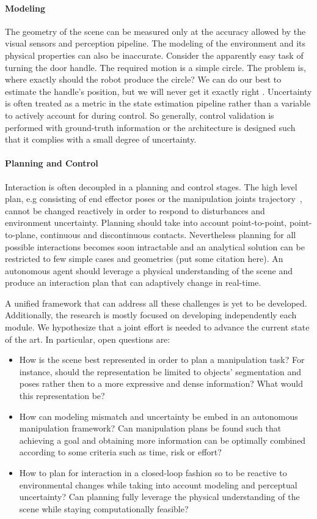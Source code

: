 \paragraph{Modeling} The geometry of the scene can be measured only at the accuracy allowed by the visual sensors and perception pipeline. The modeling of the environment and its physical properties can also be inaccurate. Consider the apparently easy task of turning the door handle. The required motion is a simple circle. The problem is, where exactly should the robot produce the circle? We can do our best to estimate the handle’s position, but we will never get it exactly right \citep{mason2018toward}. Uncertainty is often treated as a metric in the state estimation pipeline rather than a variable to actively account for during control. So generally, control validation is performed with ground-truth information or the architecture is designed such that it complies with a small degree of uncertainty. 

\paragraph{Planning and Control} Interaction is often decoupled in a planning and control stages. The high level plan, e.g consisting of end effector poses or the manipulation joints trajectory~\cite{chitta2012moveit}, cannot be changed reactively in order to respond to disturbances and environment uncertainty. Planning should take into account point-to-point, point-to-plane, continuous and discontinuous contacts. Nevertheless planning for all possible interactions becomes soon intractable and an analytical solution can be restricted to few simple cases and geometries (put some citation here). An autonomous agent should leverage a physical understanding of the scene and produce an interaction plan that can adaptively change in real-time.

\medskip 
\newline
A unified framework that can address all these challenges is yet to be developed. Additionally, the research is mostly focused on developing independently each module. We hypothesize that a joint effort is needed to advance the current state of the art. In particular, open questions are:
\begin{itemize}
\item How is the scene best represented in order to plan a manipulation task? For instance, should the representation be limited to objects' segmentation and poses rather then to a more expressive and dense information? What would this representation be? 
\item How can modeling mismatch and uncertainty be embed in an autonomous manipulation framework? Can manipulation plans be found such that achieving a goal and obtaining more information can be optimally combined according to some criteria such as time, risk or effort?
\item How to plan for interaction in a closed-loop fashion so to be reactive to environmental changes while taking into account modeling and perceptual uncertainty? Can planning fully leverage the physical understanding of the scene while staying computationally feasible?
\end{itemize}


